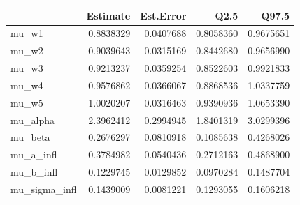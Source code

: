 
\begin{tabular}{lrrrr}
\toprule
  & Estimate & Est.Error & Q2.5 & Q97.5\\
\midrule
mu\_w1 & 0.8838329 & 0.0407688 & 0.8058360 & 0.9675651\\
mu\_w2 & 0.9039643 & 0.0315169 & 0.8442680 & 0.9656990\\
mu\_w3 & 0.9213237 & 0.0359254 & 0.8522603 & 0.9921833\\
mu\_w4 & 0.9576862 & 0.0366067 & 0.8868536 & 1.0337759\\
mu\_w5 & 1.0020207 & 0.0316463 & 0.9390936 & 1.0653390\\
\addlinespace
mu\_alpha & 2.3962412 & 0.2994945 & 1.8401319 & 3.0299396\\
mu\_beta & 0.2676297 & 0.0810918 & 0.1085638 & 0.4268026\\
mu\_a\_infl & 0.3784982 & 0.0540436 & 0.2712163 & 0.4868900\\
mu\_b\_infl & 0.1229745 & 0.0129852 & 0.0970284 & 0.1487704\\
mu\_sigma\_infl & 0.1439009 & 0.0081221 & 0.1293055 & 0.1606218\\
\bottomrule
\end{tabular}
